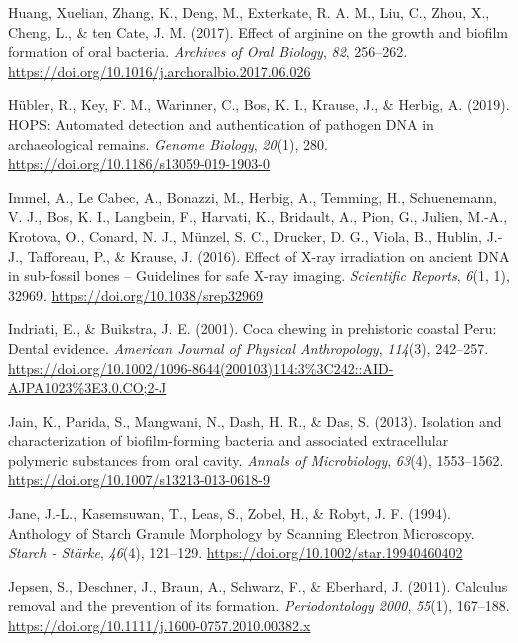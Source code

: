 \documentclass[
  letterpaper,
]{book}
\newlength{\cslhangindent}
\newlength{\cslentryspacingunit} %
\newenvironment{CSLReferences}[2] %
 {%
  \setlength{\parindent}{0pt}
  \ifodd #1
  \let\oldpar\par
  \def\par{\hangindent=\cslhangindent\oldpar}
  \fi
  \setlength{\parskip}{#2\cslentryspacingunit}
 }%
 {}
\begin{document}
\begin{CSLReferences}{1}{0}
\leavevmode{}%
Huang, Xuelian, Zhang, K., Deng, M., Exterkate, R. A. M., Liu, C., Zhou,
X., Cheng, L., \& ten Cate, J. M. (2017). Effect of arginine on the
growth and biofilm formation of oral bacteria. \emph{Archives of Oral
Biology}, \emph{82}, 256--262.
\url{https://doi.org/10.1016/j.archoralbio.2017.06.026}

\leavevmode{}%
Hübler, R., Key, F. M., Warinner, C., Bos, K. I., Krause, J., \& Herbig,
A. (2019). {HOPS}: Automated detection and authentication of pathogen
{DNA} in archaeological remains. \emph{Genome Biology}, \emph{20}(1),
280. \url{https://doi.org/10.1186/s13059-019-1903-0}

\leavevmode{}%
Immel, A., Le Cabec, A., Bonazzi, M., Herbig, A., Temming, H.,
Schuenemann, V. J., Bos, K. I., Langbein, F., Harvati, K., Bridault, A.,
Pion, G., Julien, M.-A., Krotova, O., Conard, N. J., Münzel, S. C.,
Drucker, D. G., Viola, B., Hublin, J.-J., Tafforeau, P., \& Krause, J.
(2016). Effect of {X-ray} irradiation on ancient {DNA} in sub-fossil
bones -- {Guidelines} for safe {X-ray} imaging. \emph{Scientific
Reports}, \emph{6}(1, 1), 32969. \url{https://doi.org/10.1038/srep32969}

\leavevmode{}%
Indriati, E., \& Buikstra, J. E. (2001). Coca chewing in prehistoric
coastal {Peru}: {Dental} evidence. \emph{American Journal of Physical
Anthropology}, \emph{114}(3), 242--257.
\url{https://doi.org/10.1002/1096-8644(200103)114:3\%3C242::AID-AJPA1023\%3E3.0.CO;2-J}

\leavevmode{}%
Jain, K., Parida, S., Mangwani, N., Dash, H. R., \& Das, S. (2013).
Isolation and characterization of biofilm-forming bacteria and
associated extracellular polymeric substances from oral cavity.
\emph{Annals of Microbiology}, \emph{63}(4), 1553--1562.
\url{https://doi.org/10.1007/s13213-013-0618-9}

\leavevmode{}%
Jane, J.-L., Kasemsuwan, T., Leas, S., Zobel, H., \& Robyt, J. F.
(1994). Anthology of {Starch Granule Morphology} by {Scanning Electron
Microscopy}. \emph{Starch - Stärke}, \emph{46}(4), 121--129.
\url{https://doi.org/10.1002/star.19940460402}

\leavevmode{}%
Jepsen, S., Deschner, J., Braun, A., Schwarz, F., \& Eberhard, J.
(2011). Calculus removal and the prevention of its formation.
\emph{Periodontology 2000}, \emph{55}(1), 167--188.
\url{https://doi.org/10.1111/j.1600-0757.2010.00382.x}


\end{CSLReferences}
\end{document}
